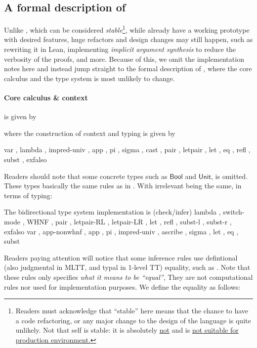 \documentclass[a4paper, 11pt]{article}
\theoremstyle{remark}\newtheorem*{remark}{Remark}
\theoremstyle{definition}\newtheorem*{definition}{Definition}
\begin{document}
\subsection{A formal description of \Tigrisd}
Unlike \Tigris, which can be considered \emph{stable}\footnote{
Readers must acknowledge that ``stable'' here means that the chance to
have a code refactoring, or any major change to the design of the language
is quite unlikely.
Not that \Tigris self is stable: it is absolutely \underline{not} and is \underline{not suitable for production environment.}
}, while \Tigrisd already have a working prototype with desired features,
huge refactors and design changes may still happen, such as rewriting it in Lean,
implementing \emph{implicit argument synthesis} to reduce the verbosity
of the proofs, and more. Because of this, we omit the implementation notes here and
instead jump straight to the formal description of \Tigrisd, where the core
calculus and the type system is most unlikely to change.

\paragraph{Core calculus \& context} is given by


where the construction of context and typing is given by


{ var
, lambda
, impred-univ
, app
, pi
, sigma
, cast
, pair
, letpair
, let
, eq
, refl
, subst
, exfalso}

Readers should note that some concrete types such
as $\mathsf{Bool}$ and $\mathsf{Unit}$, is omitted. These
types basically the same rules as in \Tigris.
With irrelevant being the same, in terms of typing:


The bidirectional type system \Tigrisd implementation is (check/infer)
{ lambda
, switch-mode
, WHNF
, pair
, letpair-RL
, letpair-LR
, let
, refl
, subst-l
, subst-r
, exfalso}
{ var
, app-nonwhnf
, app
, pi
, impred-univ
, ascribe
, sigma
, let
, eq
, subst}

Readers paying attention will notice that some inference rules
use defintional (also judgmental in MLTT, and typal in 1-level TT) equality,
such as . Note that these rules only specifies
\emph{what it means to be ``equal''},
They are not computational rules nor used for implementation purposes.
We define the equality as follows:
\end{document}
